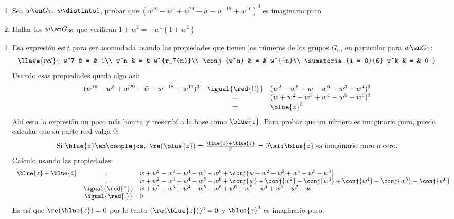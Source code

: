 \begin{enunciado}{\ejExtra}
  \begin{enumerate}[label=(\alph*)]
    \item Sea $w \en G_7, ~ w \distinto 1$, probar que
          $(w^{16} - w^5 + w^{29} - \bar{w} - w^{-18} + w^{11})^3$
          es imaginario puro

    \item Hallar los $w \en G_{36}$ que verifican $1 + w^2 = - w^4(1 + w^2)$
  \end{enumerate}
\end{enunciado}

\begin{enumerate}[label=(\alph*)]
  \item Esa expresión está para ser acomodada usando las propiedades que tienen los números de los grupos $G_n$,
        en particular para $w \en G_7$:
        $$
          \llave{rcl}{
            w^7 & = & 1\\
            w^n & = & w^{r_7(n)}\\
            \conj{w^n} & = & w^{-n}\\
            \sumatoria{i = 0}{6} w^k & = & 0
          }
        $$
        Usando esas propiedades queda algo así:
        $$
          \begin{array}{rcl}
            (w^{16} - w^5 + w^{29} - \bar{w} - w^{-18} + w^{11})^3
             & \igual{\red{!!}} &
            (w^2 - w^5 + w - w^6 - w^3 + w^4)^3 \\
             & =                &
            (w + w^2 - w^3 + w^4 - w^5 - w^6)^3 \\
             & =                &
            \blue{z}^3                          \\
          \end{array}
        $$
        Ahí esta la expresión un poco más bonita y reescribí a la base como $\blue{z}$. Para probar que un número es imaginario puro,
        puedo calcular que su parte real valga 0:
        $$
          \textstyle
          \text{Si } \blue{z} \en \complejos,~ \re(\blue{z}) = \frac{\blue{z} + \blue{\bar{z}}}{2} = 0
          \sii
          \blue{z} \text{ es imaginario puro o cero}.
        $$
        Calculo usando las propiedades:
        $$
          \begin{array}{rcl}
            \blue{z} + \blue{\bar{z}}
             & =                &
            w + w^2 - w^3 + w^4 - w^5 - w^6 + \conj{w + w^2 - w^3 + w^4 - w^5 - w^6}                                    \\
             & =                &
            w + w^2 - w^3 + w^4 - w^5 - w^6 + \conj{w} + \conj{w^2} - \conj{w^3} + \conj{w^4} - \conj{w^5} - \conj{w^6} \\
             & \igual{\red{!!}} &
            w + w^2 - w^3 + w^4 - w^5 - w^6 + w^6 + w^5 - w^4 + w^3 - w^2 - w                                           \\
             & \igual{\red{!}}  &
            0
          \end{array}
        $$
        Es así que $\re(\blue{z}) = 0$ por lo tanto $(\re(\blue{z}))^3 = 0$ y $\blue{z}^3$ es imaginario puro.


\end{enumerate}
